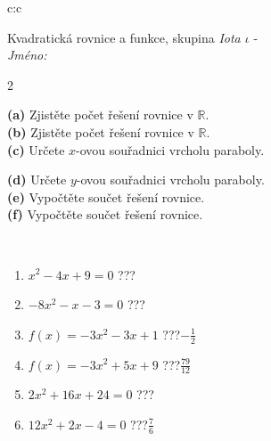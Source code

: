 \documentclass[10pt]{report}
\begin{document}
\begin{tabular}{c:c}
\begin{minipage}[c][104.5mm][t]{0.5\linewidth}
\begin{center}
\vspace{7mm}
{\huge \LARGE Kvadratická rovnice a funkce, skupina \textit{Iota $\iota$} -}\\[5mm]
\textit{Jméno:}\phantom{xxxxxxxxxxxxxxxxxxxxxxxxxxxxxxxxxxxxxxxxxxxxxxxxxxxxxxxxxxxxxxxxx}\\[5mm]
\begin{minipage}{0.95\linewidth}
\begin{center}
{\small \begin{multicols}{2} \raggedright
\textbf{(a)} Zjistěte počet řešení rovnice v \(\mathbb{R}\). \\[1mm]
\textbf{(b)} Zjistěte počet řešení rovnice v \(\mathbb{R}\). \\[1mm]
\textbf{(c)} Určete \(x\)-ovou souřadnici vrcholu paraboly. \par \columnbreak
\textbf{(d)} Určete \(y\)-ovou souřadnici vrcholu paraboly. \\[1mm]
\textbf{(e)} Vypočtěte součet řešení rovnice. \\[1mm]
\textbf{(f)} Vypočtěte součet řešení rovnice.
\end{multicols}
}
\end{center}
\end{minipage}
\\[4mm]
\begin{minipage}{0.79\linewidth}
\begin{center}
\begin{varwidth}{\linewidth}
\begin{enumerate}
\Large
\item $x^2-4x+9=0$\quad \dotfill\; ???\;\dotfill {}
\item $-8x^2-x-3=0$\quad \dotfill\; ???\;\dotfill {}
\item $f(x)=-3x^2-3x+1$\quad \dotfill\; ???\;\dotfill \quad $-\frac{1}{2}$
\item $f(x)=-3x^2+5x+9$\quad \dotfill\; ???\;\dotfill \quad $\frac{79}{12}$
\item $2x^2+16x+24=0$\quad \dotfill\; ???\;\dotfill {}
\item $12x^2+2x-4=0$\quad \dotfill\; ???\;\dotfill \quad $\frac{7}{6}$
\end{enumerate}
\end{varwidth}
\end{center}

\end{minipage}
\end{center}
\end{minipage}
\end{tabular}
\end{document}
